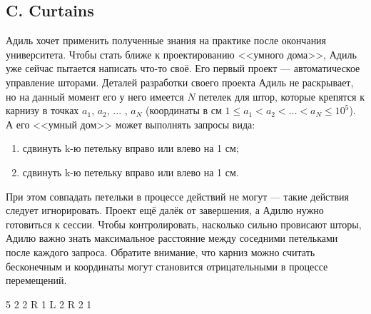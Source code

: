 \subsection*{C. Curtains}

Адиль хочет применить полученные знания на практике после окончания университета. Чтобы стать ближе к проектированию <<умного дома>>, Адиль уже сейчас пытается написать что-то своё. Его первый проект --- автоматическое управление шторами. Деталей разработки своего проекта Адиль не раскрывает, но на данный момент его у него имеется $N$ петелек для штор, которые крепятся к карнизу в точках $a_1$, $a_2$, ... , $a_N$ (координаты в см \mbox{$1 \le a_1 < a_2 < \dots < a_N \le 10^5$}). А его <<умный дом>> может выполнять запросы вида:
\begin{enumerate}
\item сдвинуть k-ю петельку вправо или влево на 1 см;
\item сдвинуть k-ю петельку вправо или влево на 1 см.
\end{enumerate}
При этом совпадать петельки в процессе действий не могут --- такие действия следует игнорировать. Проект ещё далёк от завершения, а Адилю нужно готовиться к сессии. Чтобы контролировать, насколько сильно провисают шторы, Адилю важно знать максимальное расстояние между соседними петельками после каждого запроса. Обратите внимание, что карниз можно считать бесконечным и координаты могут становится отрицательными в процессе перемещений.



{
5  
}
{
2  2  \newline
R 1 \newline
L 2 \newline
R 2 \newline
}{
1  
}



